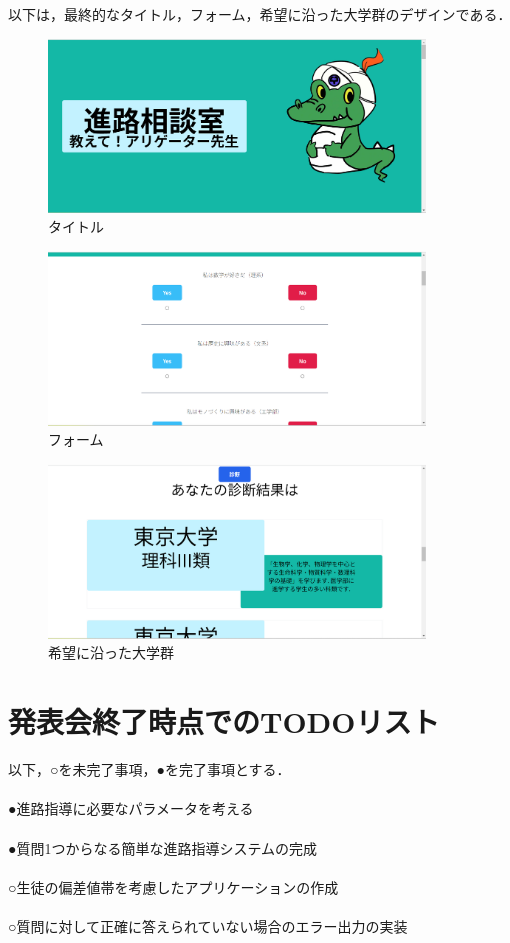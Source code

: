 \documentclass[a4j，titlepage]{jarticle}
\begin{document}
\begin{itemize}
以下は，最終的なタイトル，フォーム，希望に沿った大学群のデザインである．
\begin{figure}[htbp]
  \begin{center}
  \includegraphics[width=100mm]{title.png}
  \caption{タイトル}
  \end{center}
\end{figure}
\begin{figure}[htbp]
  \begin{center}
  \includegraphics[width=100mm]{form.png}
  \caption{フォーム}
  \end{center}
\end{figure}
\begin{figure}[htbp]
  \begin{center}
  \includegraphics[width=100mm]{univs.png}
  \caption{希望に沿った大学群}
  \end{center}
\end{figure}
\section{発表会終了時点でのTODOリスト}
以下，○を未完了事項，●を完了事項とする．\\
\\
●進路指導に必要なパラメータを考える\\
\\
●質問1つからなる簡単な進路指導システムの完成\\
\\
○生徒の偏差値帯を考慮したアプリケーションの作成\\
\\
○質問に対して正確に答えられていない場合のエラー出力の実装\\


\end{itemize}
\end{document}
